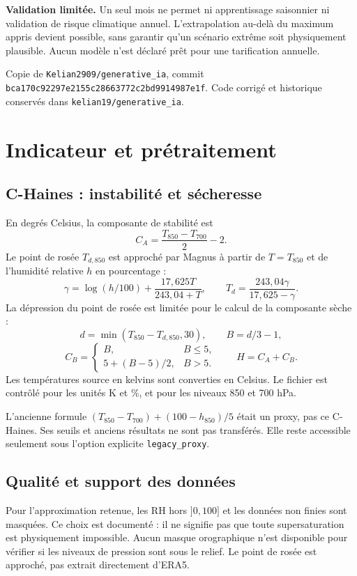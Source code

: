 \documentclass[11pt,a4paper]{article}
\newcommand{\smallnote}[1]{{\small\color{Muted}#1}}
\begin{document}
\begin{limitbox}
\textbf{Validation limitée.} Un seul mois ne permet ni apprentissage saisonnier ni validation de risque climatique annuel. L'extrapolation au-delà du maximum appris devient possible, sans garantir qu'un scénario extrême soit physiquement plausible. Aucun modèle n'est déclaré prêt pour une tarification annuelle.
\end{limitbox}
\smallnote{Copie de \texttt{Kelian2909/generative\_ia}, commit \texttt{bca170c92297e2155c28663772c2bd9914987e1f}. Code corrigé et historique conservés dans \texttt{kelian19/generative\_ia}.}

\newpage
\section{Indicateur et prétraitement}
\subsection*{C-Haines : instabilité et sécheresse}
En degrés Celsius, la composante de stabilité est
\[
C_A=\frac{T_{850}-T_{700}}2-2.
\]
Le point de rosée $T_{d,850}$ est approché par Magnus à partir de $T=T_{850}$ et de l'humidité relative $h$ en pourcentage :
\[
\gamma=\log(h/100)+\frac{17{,}625T}{243{,}04+T},\qquad
T_d=\frac{243{,}04\gamma}{17{,}625-\gamma}.
\]
La dépression du point de rosée est limitée pour le calcul de la composante sèche :
\[
d=\min(T_{850}-T_{d,850},30),\qquad B=d/3-1,
\]
\[
C_B=\begin{cases}B,&B\leq5,\\5+(B-5)/2,&B>5.\end{cases}
\qquad \boxed{H=C_A+C_B.}
\]
Les températures source en kelvins sont converties en Celsius. Le fichier est contrôlé pour les unités K et \%, et pour les niveaux 850 et 700 hPa.

\begin{limitbox}
L'ancienne formule $(T_{850}-T_{700})+(100-h_{850})/5$ était un proxy, pas ce C-Haines. Ses seuils et anciens résultats ne sont pas transférés. Elle reste accessible seulement sous l'option explicite \texttt{legacy\_proxy}.
\end{limitbox}

\subsection*{Qualité et support des données}
Pour l'approximation retenue, les RH hors $]0,100]$ et les données non finies sont masquées. Ce choix est documenté : il ne signifie pas que toute supersaturation est physiquement impossible. Aucun masque orographique n'est disponible pour vérifier si les niveaux de pression sont sous le relief. Le point de rosée est approché, pas extrait directement d'ERA5.
\end{document}
